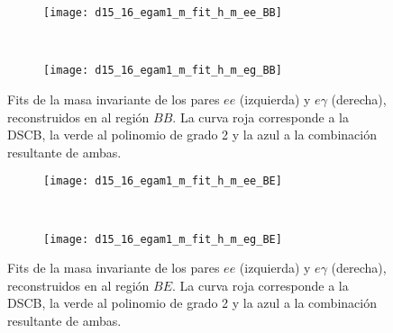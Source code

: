 




\begin{figure}

	\begin{subfigure}{0.5\textwidth}
		\texttt{[image: d15\_16\_egam1\_m\_fit\_h\_m\_ee\_BB]} 
	\end{subfigure}
	~
	\begin{subfigure}{0.5\textwidth}
		\texttt{[image: d15\_16\_egam1\_m\_fit\_h\_m\_eg\_BB]}
	\end{subfigure}

	
	\caption{Fits de la masa invariante de los pares $ee$ (izquierda) y $e\gamma$ (derecha), reconstruidos en al región $BB$. La curva roja corresponde a la DSCB, la verde al polinomio de grado 2 y la azul a la combinación resultante de ambas.}
\label{fits_BB}
\end{figure}

\begin{figure}

	\begin{subfigure}{0.5\textwidth}
		\texttt{[image: d15\_16\_egam1\_m\_fit\_h\_m\_ee\_BE]} 
	\end{subfigure}
	~
	\begin{subfigure}{0.5\textwidth}
		\texttt{[image: d15\_16\_egam1\_m\_fit\_h\_m\_eg\_BE]}
	\end{subfigure}

	
	\caption{Fits de la masa invariante de los pares $ee$ (izquierda) y $e\gamma$ (derecha), reconstruidos en al región $BE$. La curva roja corresponde a la DSCB, la verde al polinomio de grado 2 y la azul a la combinación resultante de ambas.}
\label{fits_BE}
\end{figure}


